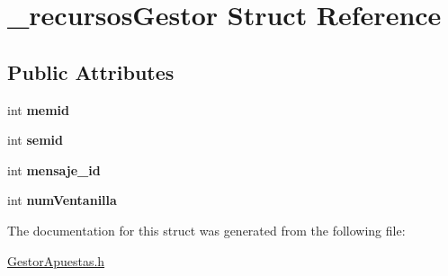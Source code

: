 \hypertarget{struct__recursosGestor}{}\section{\+\_\+recursos\+Gestor Struct Reference}
\label{struct__recursosGestor}
\subsection*{Public Attributes}
\begin{DoxyCompactItemize}
\item 
int {\bfseries memid}\hypertarget{struct__recursosGestor_aee6b39fc5b097c477528c7cd49549619}{}\label{struct__recursosGestor_aee6b39fc5b097c477528c7cd49549619}

\item 
int {\bfseries semid}\hypertarget{struct__recursosGestor_a60a4e0c799300fbbeb1d09e417198a3c}{}\label{struct__recursosGestor_a60a4e0c799300fbbeb1d09e417198a3c}

\item 
int {\bfseries mensaje\+\_\+id}\hypertarget{struct__recursosGestor_a6d1c5ca5194b85ec6c49afc7a969485a}{}\label{struct__recursosGestor_a6d1c5ca5194b85ec6c49afc7a969485a}

\item 
int {\bfseries num\+Ventanilla}\hypertarget{struct__recursosGestor_a8c9cdec45e1e22c3370a584924da32d2}{}\label{struct__recursosGestor_a8c9cdec45e1e22c3370a584924da32d2}

\end{DoxyCompactItemize}


The documentation for this struct was generated from the following file\+:\begin{DoxyCompactItemize}
\item 
\hyperlink{GestorApuestas_8h}{Gestor\+Apuestas.\+h}\end{DoxyCompactItemize}

